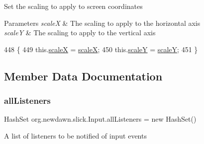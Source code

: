 Set the scaling to apply to screen coordinates


\begin{DoxyParams}{Parameters}
{\em scaleX} & The scaling to apply to the horizontal axis \\
\hline
{\em scaleY} & The scaling to apply to the vertical axis \\
\hline
\end{DoxyParams}

\begin{DoxyCode}
448                                                      \{
449         this.\mbox{\hyperlink{classorg_1_1newdawn_1_1slick_1_1_input_ad007c0ee133e9e1ca57f2ae95c7df166}{scaleX}} = \mbox{\hyperlink{classorg_1_1newdawn_1_1slick_1_1_input_ad007c0ee133e9e1ca57f2ae95c7df166}{scaleX}};
450         this.\mbox{\hyperlink{classorg_1_1newdawn_1_1slick_1_1_input_a1a1f2fde64f0947353a3b1c2ea09d42c}{scaleY}} = \mbox{\hyperlink{classorg_1_1newdawn_1_1slick_1_1_input_a1a1f2fde64f0947353a3b1c2ea09d42c}{scaleY}};
451     \}
\end{DoxyCode}


\subsection{Member Data Documentation}
\mbox{\label{classorg_1_1newdawn_1_1slick_1_1_input_a26d5ed77d8b0444118d630336d0ab6d7}} 
\subsubsection{\texorpdfstring{all\+Listeners}{allListeners}}
{\footnotesize\ttfamily Hash\+Set org.\+newdawn.\+slick.\+Input.\+all\+Listeners = new Hash\+Set()\hspace{0.3cm}{\ttfamily [protected]}}

A list of listeners to be notified of input events \mbox{\label{classorg_1_1newdawn_1_1slick_1_1_input_a1f3df3cf41eaf8ae3bdf194d5cf96dd0}} 
